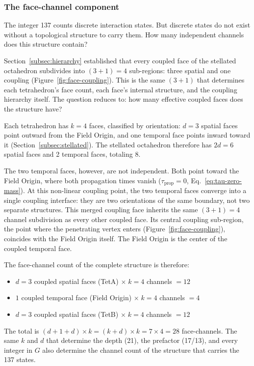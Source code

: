 \documentclass[aps,prd,preprint,superscriptaddress,showpacs,preprintnumbers,amsmath,amssymb,nofootinbib]{revtex4-2}
\begin{document}
\subsubsection*{The face-channel component}

The integer 137 counts discrete interaction states. But discrete states do not exist without a topological structure to carry them. How many independent channels does this structure contain?

Section~\ref{subsec:hierarchy} established that every coupled face of the stellated octahedron subdivides into $(3{+}1) = 4$ sub-regions: three spatial and one coupling (Figure~\ref{fig:face-coupling}). This is the same $(3{+}1)$ that determines each tetrahedron's face count, each face's internal structure, and the coupling hierarchy itself. The question reduces to: how many effective coupled faces does the structure have?

Each tetrahedron has $k = 4$ faces, classified by orientation: $d = 3$ spatial faces point outward from the Field Origin, and one temporal face points inward toward it (Section~\ref{subsec:stellated}). The stellated octahedron therefore has $2d = 6$ spatial faces and 2 temporal faces, totaling 8.

The two temporal faces, however, are not independent. Both point toward the Field Origin, where both propagation times vanish ($\tau_{\text{prop}} = 0$, Eq.~\ref{eq:tau-zero-mass}). At this non-linear coupling point, the two temporal faces converge into a single coupling interface: they are two orientations of the same boundary, not two separate structures. This merged coupling face inherits the same $(3{+}1) = 4$ channel subdivision as every other coupled face. Its central coupling sub-region, the point where the penetrating vertex enters (Figure~\ref{fig:face-coupling}), coincides with the Field Origin itself. The Field Origin is the center of the coupled temporal face.

The face-channel count of the complete structure is therefore:
\begin{itemize}
\item $d = 3$ coupled spatial faces (TetA) $\times\; k = 4$ channels $= 12$
\item $1$ coupled temporal face (Field Origin) $\times\; k = 4$ channels $= 4$
\item $d = 3$ coupled spatial faces (TetB) $\times\; k = 4$ channels $= 12$
\end{itemize}
The total is $(d + 1 + d) \times k = (k + d) \times k = 7 \times 4 = 28$ face-channels. The same $k$ and $d$ that determine the depth (21), the prefactor (17/13), and every integer in $G$ also determine the channel count of the structure that carries the 137 states.
\end{document}
